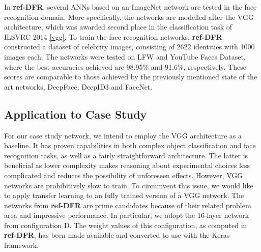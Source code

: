 \noindent In \textbf{ref-DFR}, several ANNs based on an ImageNet network are tested in the face recognition domain. More specifically, the networks are modelled after the VGG architecture, which was awarded second place in the classification task of ILSVRC 2014 \ref{vgg}. To train the face recognition networks, \textbf{ref-DFR} constructed a dataset of celebrity images, consisting of 2622 identities with 1000 images each. The networks were tested on LFW and YouTube Faces Dataset, where the best accuracies achieved are 98.95\% and 91.6\%, respectively. These scores are comparable to those achieved by the previously mentioned state of the art networks, DeepFace, DeepID3 and FaceNet.

\subsection{Application to Case Study}

For our case study network, we intend to employ the VGG architecture as a baseline. It has proven capabilities in both complex object classification and face recognition tasks, as well as a fairly straightforward architecture. The latter is beneficial as lower complexity makes reasoning about experimental choices less complicated and reduces the possibility of unforeseen effects. However, VGG networks are prohibitively slow to train. To circumvent this issue, we would like to apply transfer learning to an fully trained version of a VGG network. The networks from \textbf{ref-DFR} are prime candidates because of their related problem area and impressive performance. In particular, we adopt the 16-layer network from configuration D. The weight values of this configuration, as computed in \textbf{ref-DFR}, has been made available and converted to use with the Keras framework.



